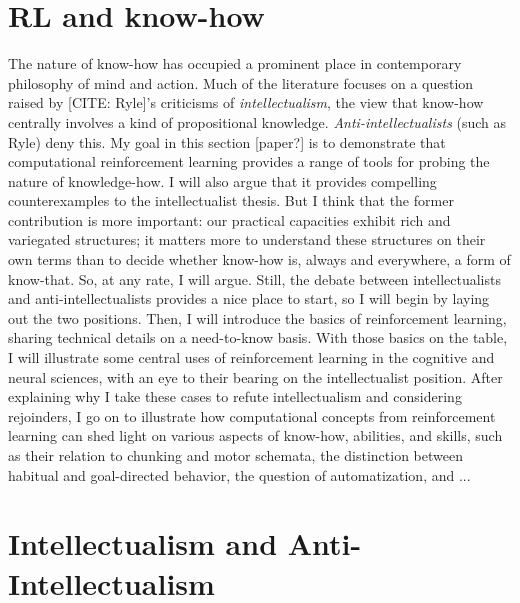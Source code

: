\section{RL and know-how}

The nature of know-how has occupied a prominent place in contemporary philosophy of mind and action.
Much of the literature focuses on a question raised by [CITE: Ryle]'s criticisms of \emph{intellectualism}, the view that know-how centrally involves a kind of propositional knowledge.
\emph{Anti-intellectualists} (such as Ryle) deny this.
My goal in this section [paper?] is to demonstrate that computational reinforcement learning provides a range of tools for probing the nature of knowledge-how.
I will also argue that it provides compelling counterexamples to the intellectualist thesis.
But I think that the former contribution is more important: our practical capacities exhibit rich and variegated structures; it matters more to understand these structures on their own terms than to decide whether know-how is, always and everywhere, a form of know-that.
So, at any rate, I will argue.
Still, the debate between intellectualists and anti-intellectualists provides a nice place to start, so I will begin by laying out the two positions.
Then, I will introduce the basics of reinforcement learning, sharing technical details on a need-to-know basis.
With those basics on the table, I will illustrate some central uses of reinforcement learning in the cognitive and neural sciences, with an eye to their bearing on the intellectualist position.
After explaining why I take these cases to refute intellectualism and considering rejoinders, I go on to illustrate how computational concepts from reinforcement learning can shed light on various aspects of know-how, abilities, and skills, such as their relation to chunking and motor schemata, the distinction between habitual and goal-directed behavior, the question of automatization, and ...

\section{Intellectualism and Anti-Intellectualism}

